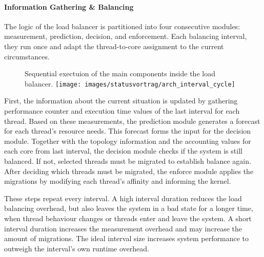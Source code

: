 \paragraph{Information Gathering \& Balancing}
The logic of the load balancer is partitioned into four consecutive modules:
measurement, prediction, decision, and enforcement.
Each balancing interval, they run once and adapt the thread-to-core
assignment to the current circumstances.

\begin{figure}[h]
  \setcapindent*{1em}
  \begin{captionbeside}{Sequential exectuion of the main components inside the load
  balancer.}
  \texttt{[image: images/statusvortrag/arch\_interval\_cycle]}
  \end{captionbeside}
  \label{arch:fig:intervalcycle}
\end{figure}

First, the information about the current situation is updated by gathering
performance counter and execution time values of the last interval for each
thread.
Based on these measurements, the prediction module generates a forecast for
each thread's resource needs.
This forecast forms the input for the decision module.
Together with the topology information and the accounting values for each core
from last interval, the decision module checks if the system is still balanced.
If not, selected threads must be migrated to establish balance again.
After deciding which threads must be migrated, the enforce module applies the
migrations by modifying each thread's affinity and informing the kernel.

These steps repeat every interval. A high interval duration reduces the
load balancing overhead, but also leaves the system in a bad state for a longer
time, when thread behaviour changes or threads enter and leave the system.
A short interval duration increases the measurement overhead and may increase
the amount of migrations.
The ideal interval size increases system performance to outweigh the interval's
own runtime overhead.
\\

